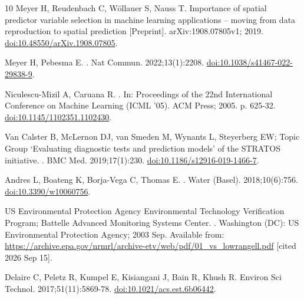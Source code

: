 \documentclass[10pt,letterpaper]{article}
\begin{document}
\begin{thebibliography}{10}
{Meyer} H, {Reudenbach} C, {W{\"o}llauer} S, {Nauss} T. {Importance of spatial
  predictor variable selection in machine learning applications -- moving from
  data reproduction to spatial prediction} [Preprint]. arXiv:1908.07805v1;
  2019.
\newblock \href {http://dx.doi.org/10.48550/arXiv.1908.07805}
  {doi:10.48550/arXiv.1908.07805}.

{Meyer} H, {Pebesma} E.
.
\newblock Nat Commun. 2022;13(1):2208.
\newblock \href {http://dx.doi.org/10.1038/s41467-022-29838-9}
  {doi:10.1038/s41467-022-29838-9}.

{Niculescu-Mizil} A, {Caruana} R.
.
\newblock In: Proceedings of the 22nd International Conference on Machine
  Learning (ICML '05). ACM Press; 2005. p. 625-32.
\newblock \href {http://dx.doi.org/10.1145/1102351.1102430}
  {doi:10.1145/1102351.1102430}.

{Van Calster} B, {McLernon} DJ, {van Smeden} M, {Wynants} L, {Steyerberg} EW;
  {Topic Group `Evaluating diagnostic tests and prediction models' of the
  STRATOS initiative}.
.
\newblock BMC Med. 2019;17(1):230.
\newblock \href {http://dx.doi.org/10.1186/s12916-019-1466-7}
  {doi:10.1186/s12916-019-1466-7}.

{Andres} L, {Boateng} K, {Borja-Vega} C, {Thomas} E.
.
\newblock Water (Basel). 2018;10(6):756.
\newblock \href {http://dx.doi.org/10.3390/w10060756} {doi:10.3390/w10060756}.

{US Environmental Protection Agency Environmental Technology Verification
  Program; Battelle Advanced Monitoring Systems Center}.
.
\newblock Washington (DC): US Environmental Protection Agency; 2003 Sep.
\newblock Available from:
  \url{https://archive.epa.gov/nrmrl/archive-etv/web/pdf/01_vs_lowrangell.pdf}
  [cited 2026 Sep 15].

{Delaire} C, {Peletz} R, {Kumpel} E, {Kisiangani} J, {Bain} R, {Khush} R.
\newblock Environ Sci Technol. 2017;51(11):5869-78.
\newblock \href {http://dx.doi.org/10.1021/acs.est.6b06442}
  {doi:10.1021/acs.est.6b06442}.


\end{thebibliography}
\end{document}
